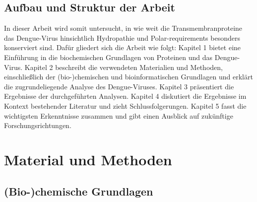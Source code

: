 \documentclass[german,version-2022-01]{uzl-thesis}
\begin{document}
\section{Aufbau und Struktur der Arbeit}
In dieser Arbeit wird somit untersucht, in wie weit die Transmembranproteine das Dengue-Virus hinsichtlich Hydropathie und Polar-requirements besonders konserviert sind. Daf\"ur gliedert sich die Arbeit wie folgt: Kapitel 1 bietet eine Einf\"uhrung in die biochemischen Grundlagen von Proteinen und das Dengue-Virus. Kapitel 2 beschreibt die verwendeten Materialien und Methoden, einschlie\ss{}lich der (bio-)chemischen und bioinformatischen Grundlagen und erkl\"art die zugrundeliegende Analyse des Dengue-Viruses. Kapitel 3 pr\"asentiert die Ergebnisse der durchgef\"uhrten Analysen. Kapitel 4 diskutiert die Ergebnisse im Kontext bestehender Literatur und zieht Schlussfolgerungen. Kapitel 5 fasst die wichtigsten Erkenntnisse zusammen und gibt einen Ausblick auf zuk\"unftige Forschungsrichtungen.

\chapter{Material und Methoden}%
\label{chapter-use}

\section{(Bio-)chemische Grundlagen}
\end{document}

